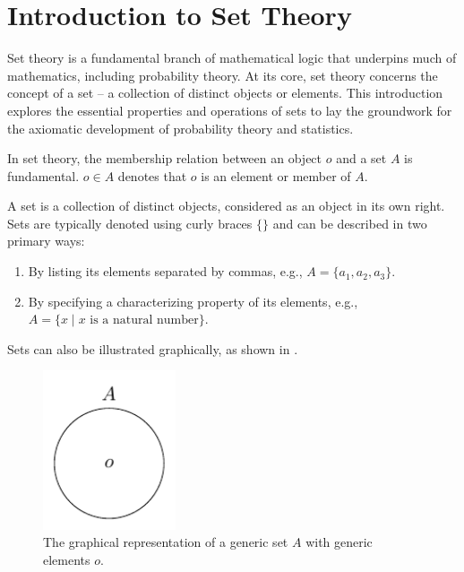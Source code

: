 \chapter{Introduction to Set Theory}
\label{chp:set_theory}
Set theory is a fundamental branch of mathematical logic that underpins much of mathematics, including probability theory. At its core, set theory concerns the concept of a set -- a collection of distinct objects or elements. This introduction explores the essential properties and operations of sets to lay the groundwork for the axiomatic development of probability theory and statistics.


\begin{definition}[Membership]
	In set theory, the membership relation between an object $o$ and a set $A$ is fundamental. $o \in A$ denotes that $o$ is an element or member of $A$.
\end{definition}

\begin{definition}[Set]
	A set is a collection of distinct objects, considered as an object in its own right. Sets are typically denoted using curly braces $\{\}$ and can be described in two primary ways:
	\begin{enumerate}
		\item By listing its elements separated by commas, e.g., $A = \{a_1, a_2, a_3\}$.
		\item By specifying a characterizing property of its elements, e.g., \newline $A = \{x \mid x \text{ is a natural number}\}$.
	\end{enumerate}
	Sets can also be illustrated graphically, as shown in .
	\begin{figure}[H]
		\centering
		\includegraphics[width = 0.35\textwidth]{figures/generic_set.pdf}
		\caption{The graphical representation of a generic set $A$ with generic elements $o$.}
		\label{fig:generic_set}
	\end{figure}
\end{definition}

